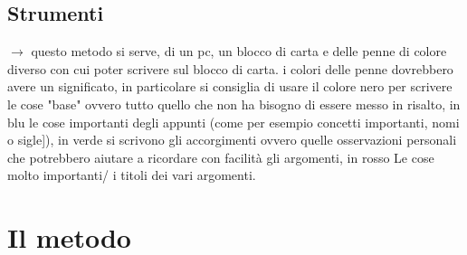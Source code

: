 \documentclass[11pt,a4paper]{article}
\begin{document}
\subsection{Strumenti}
$\rightarrow$ questo metodo si serve, di un pc, un blocco di carta e delle penne di colore diverso con cui poter scrivere sul blocco di carta. i colori delle penne dovrebbero avere un significato, in particolare si consiglia di usare il colore nero per scrivere le cose "base" ovvero tutto quello che non ha bisogno di essere messo in risalto, in blu le cose importanti degli appunti (come per esempio concetti importanti, nomi o sigle]), in verde si scrivono gli accorgimenti ovvero quelle osservazioni personali che potrebbero aiutare a ricordare con facilità gli argomenti, in rosso Le cose molto importanti/ i titoli dei vari argomenti.\\
\newline

\section{Il metodo}
\end{document}
